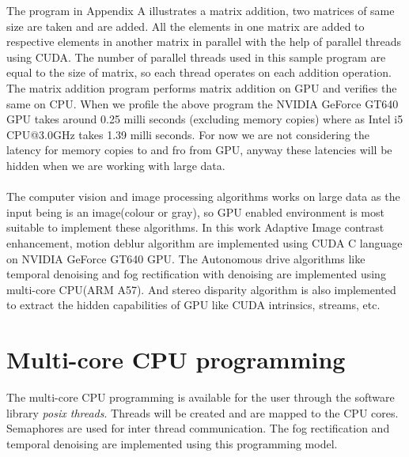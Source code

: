 The program in Appendix A illustrates a matrix addition, two matrices of same size are taken and are added. All the elements in one matrix are added to respective elements in another matrix in parallel with the help of parallel threads using CUDA. The number of parallel threads used in this sample program are equal to the size of matrix, so each thread operates on each addition operation. The matrix addition program performs matrix addition on GPU and verifies the same on CPU. When we profile the above program the NVIDIA GeForce GT640 GPU takes around 0.25 milli seconds (excluding memory copies) where as Intel i5 CPU@3.0GHz takes 1.39 milli seconds. For now we are not considering the latency for memory copies to and fro from GPU, anyway these latencies will be hidden when we are working with large data.\paragraph*{}The computer vision and image processing algorithms works on large data as the input being is an image(colour or gray), so GPU enabled environment is most suitable to implement these algorithms. In this work Adaptive Image contrast enhancement, motion deblur algorithm are implemented using CUDA C language on NVIDIA GeForce GT640 GPU. The Autonomous drive algorithms like temporal denoising and fog rectification with denoising are implemented using multi-core CPU(ARM A57). And stereo disparity algorithm is also implemented to extract the hidden capabilities of GPU like CUDA intrinsics, streams, etc.

\section{Multi-core CPU programming}
The multi-core CPU programming is available for the user through the software library \textit{posix threads}. Threads will be created and are mapped to the CPU cores. Semaphores are used for inter thread communication. The fog rectification and temporal denoising are implemented using this programming model.


%